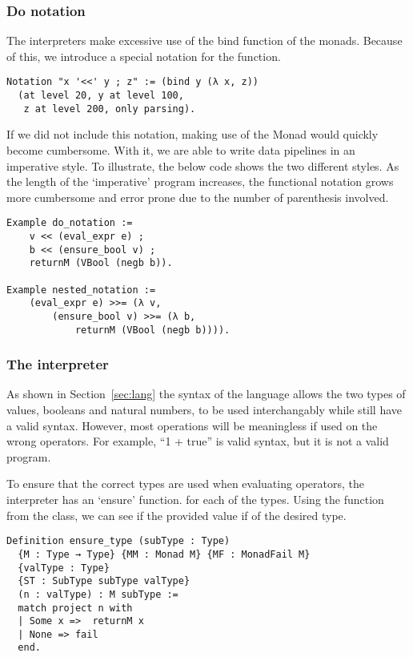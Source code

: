 \subsubsection{Do notation}
The interpreters make excessive use of the bind function of the monads.
Because of this, we introduce a special notation for the function.

\begin{listing}
\begin{verbatim}
Notation "x '<<' y ; z" := (bind y (λ x, z))
  (at level 20, y at level 100, 
   z at level 200, only parsing).
\end{verbatim}
\end{listing}

If we did not include this notation, making use of the Monad would quickly
become cumbersome. With it, we are able to write data pipelines in an
imperative style. To illustrate, the below code shows the two
different styles. As the length of the `imperative' program increases, the
functional notation grows more cumbersome and error prone due to the number of
parenthesis involved.

\begin{listing}
\begin{verbatim}
Example do_notation :=
	v << (eval_expr e) ;
	b << (ensure_bool v) ;
	returnM (VBool (negb b)).

Example nested_notation :=
	(eval_expr e) >>= (λ v,
		(ensure_bool v) >>= (λ b,
			returnM (VBool (negb b)))).
\end{verbatim}
\end{listing}

\subsubsection{The interpreter}
As shown in Section~\ref{sec:lang} the syntax of the language allows the two
types of values, booleans and natural numbers, to be used interchangably while
still have a valid syntax. However, most operations will be meaningless if used
on the wrong operators. For example, ``1 + true'' is valid syntax, but it is 
not a valid program.

To ensure that the correct types are used when evaluating operators,
the interpreter has an `ensure' function. for each of the types. 
Using the  function from the  class, we can see if
the provided value if of the desired type.

\begin{verbatim}
Definition ensure_type (subType : Type)
  {M : Type → Type} {MM : Monad M} {MF : MonadFail M} 
  {valType : Type}
  {ST : SubType subType valType}
  (n : valType) : M subType :=
  match project n with
  | Some x =>  returnM x
  | None => fail
  end.
\end{verbatim}


